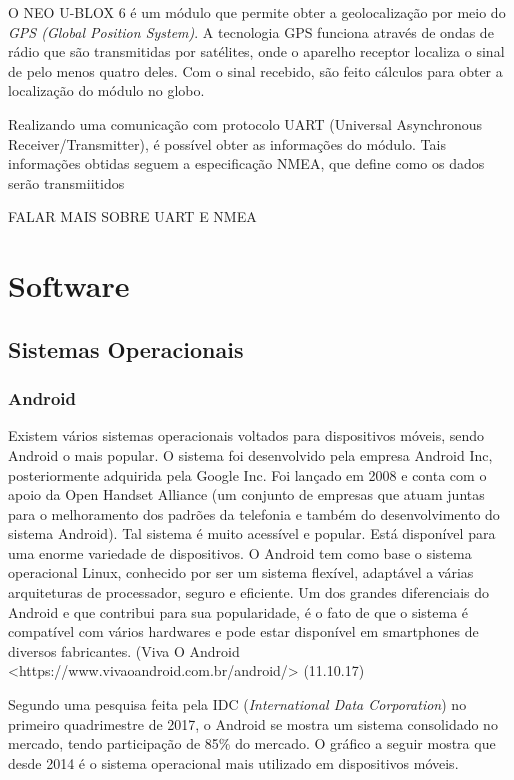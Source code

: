 \documentclass[
	12pt,				%
	oneside,			%
	a4paper,			%
	brazil				%
]{abntex2}
\begin{document}
{O NEO U-BLOX 6 é um módulo que permite obter a geolocalização por meio do \textit{GPS (Global Position System)}. A tecnologia GPS funciona através de ondas de rádio que são transmitidas por satélites, onde o aparelho receptor localiza o sinal de pelo menos quatro deles. Com o sinal recebido, são feito cálculos para obter a localização do módulo no globo. 

Realizando uma comunicação com protocolo UART (Universal Asynchronous Receiver/Transmitter), é possível obter as informações do módulo. Tais informações obtidas seguem a especificação NMEA, que define como os dados serão transmiitidos

FALAR MAIS SOBRE UART E NMEA

\section{Software}

\subsection{Sistemas Operacionais}

\subsubsection{Android}

Existem vários sistemas operacionais voltados para dispositivos móveis, sendo Android o mais popular. O sistema foi desenvolvido pela empresa Android Inc, posteriormente adquirida pela Google Inc. Foi lançado em 2008 e conta com o apoio da Open Handset Alliance (um conjunto de empresas que atuam juntas para o melhoramento dos padrões da telefonia e também do desenvolvimento do sistema Android). 
Tal sistema é muito acessível e popular. Está disponível para uma enorme variedade de dispositivos. O Android tem como base o sistema operacional Linux, conhecido por ser um sistema flexível, adaptável a várias arquiteturas de processador, seguro e eficiente. Um dos grandes diferenciais do Android e que contribui para sua popularidade, é o fato de que o sistema é compatível com vários hardwares e pode estar disponível em smartphones de diversos fabricantes. (Viva O Android <https://www.vivaoandroid.com.br/android/> (11.10.17)

Segundo uma pesquisa feita pela IDC (\textit{International Data Corporation}) no primeiro quadrimestre de 2017, o Android se mostra um sistema consolidado no mercado, tendo participação de 85\% do mercado. O gráfico a seguir mostra que desde 2014 é o sistema operacional mais utilizado em dispositivos móveis.

}
\end{document}
